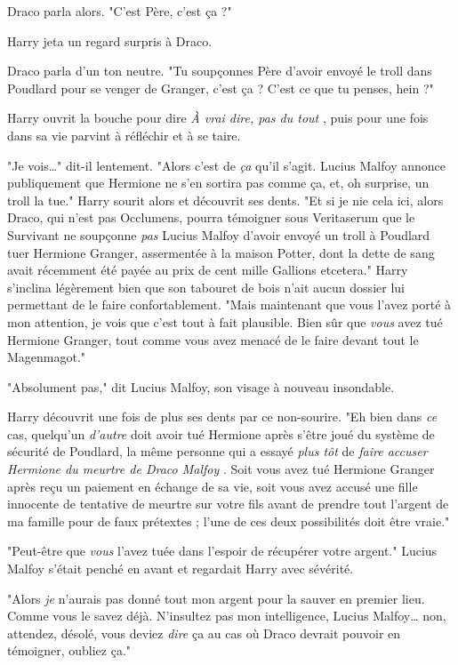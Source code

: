 Draco parla alors. "C'est Père, c'est ça ?"

Harry jeta un regard surpris à Draco.

Draco parla d'un ton neutre. "Tu soupçonnes Père d'avoir envoyé le troll dans Poudlard pour se venger de Granger, c'est ça ? C'est ce que tu penses, hein ?"

Harry ouvrit la bouche pour dire \emph{À vrai dire, pas du tout} , puis pour une fois dans sa vie parvint à réfléchir et à se taire.

"Je vois…" dit-il lentement. "Alors c'est de \emph{ça}  qu'il s'agit. Lucius Malfoy annonce publiquement que Hermione ne s'en sortira pas comme ça, et, oh surprise, un troll la tue." Harry sourit alors et découvrit ses dents. "Et si je nie cela ici, alors Draco, qui n'est pas Occlumens, pourra témoigner sous Veritaserum que le Survivant ne soupçonne \emph{pas}  Lucius Malfoy d'avoir envoyé un troll à Poudlard tuer Hermione Granger, assermentée à la maison Potter, dont la dette de sang avait récemment été payée au prix de cent mille Gallions etcetera." Harry s'inclina légèrement bien que son tabouret de bois n'ait aucun dossier lui permettant de le faire confortablement. "Mais maintenant que vous l'avez porté à mon attention, je vois que c'est tout à fait plausible. Bien sûr que \emph{vous}  avez tué Hermione Granger, tout comme vous avez menacé de le faire devant tout le Magenmagot."

"Absolument pas," dit Lucius Malfoy, son visage à nouveau insondable.

Harry découvrit une fois de plus ses dents par ce non-sourire. "Eh bien dans \emph{ce}  cas, quelqu'un \emph{d'autre}  doit avoir tué Hermione après s'être joué du système de sécurité de Poudlard, la même personne qui a essayé \emph{plus tôt}  de \emph{faire accuser Hermione du meurtre de Draco Malfoy} . Soit vous avez tué Hermione Granger après reçu un paiement en échange de sa vie, soit vous avez accusé une fille innocente de tentative de meurtre sur votre fils avant de prendre tout l'argent de ma famille pour de faux prétextes ; l'une de ces deux possibilités doit être vraie."

"Peut-être que \emph{vous}  l'avez tuée dans l'espoir de récupérer votre argent." Lucius Malfoy s'était penché en avant et regardait Harry avec sévérité.

"Alors \emph{je}  n'aurais pas donné tout mon argent pour la sauver en premier lieu. Comme vous le savez déjà. N'insultez pas mon intelligence, Lucius Malfoy… non, attendez, désolé, vous deviez \emph{dire}  ça au cas où Draco devrait pouvoir en témoigner, oubliez ça."

